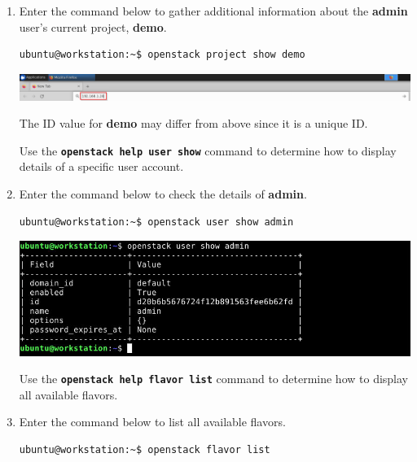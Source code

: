 \documentclass[letterpaper, 12pt]{article}
\begin{document}
\begin{enumerate}
    \item Enter the command below to gather additional information about the \textbf{admin} user's current project,
    \textbf{demo}.
\begin{lstlisting}
ubuntu@workstation:~$ openstack project show demo
\end{lstlisting}

    \begin{center}
        \includegraphics[width=\linewidth]{images/part_1_step_6.png}
    \end{center}

    \begin{notebox}
        The ID value for \textbf{demo} may differ from above since it is a unique ID.
    \end{notebox}

    \begin{tipbox}{}
        Use the \textbf{\texttt{openstack help user show}} command to determine how to display details of a specific
        user account.
    \end{tipbox}

    \item Enter the command below to check the details of \textbf{admin}.
\begin{lstlisting}
ubuntu@workstation:~$ openstack user show admin
\end{lstlisting}

    \begin{center}
        \includegraphics[width=\linewidth]{images/part_2_step_7.png}
    \end{center}

    \begin{tipbox}{}
        Use the \textbf{\texttt{openstack help flavor list}} command to determine how to display all available flavors.
    \end{tipbox}

    \item Enter the command below to list all available flavors.
\begin{lstlisting}
ubuntu@workstation:~$ openstack flavor list
\end{lstlisting}


\end{enumerate}
\end{document}

